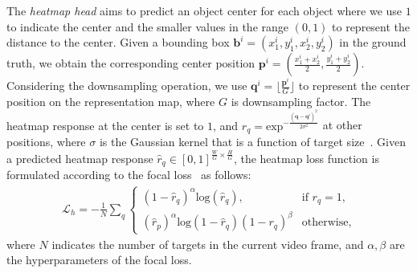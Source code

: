 \documentclass[acmsmall]{acmart}
\begin{document}
The \emph{heatmap head} {aims} to predict an object center {for each object where we use $1$ to indicate the center and the smaller values in the range $(0,1)$ to represent the distance to the center.}
Given a bounding box $\boldsymbol{b}^i = (x_1^i,y_1^i,x_2^i,y_2^i)$ in the ground truth, we obtain the corresponding center position $ \boldsymbol{p}^i  = (\frac{x_1^i+x_2^i}{2}, \frac{y_1^i+y_2^i}{2})$.
{
Considering the downsampling operation, we use $\boldsymbol{q}^i = \lfloor \frac{\boldsymbol{p}^i}{G}  \rfloor $ to represent the center position on the representation map, where $G$ is downsampling factor.
The heatmap response at the center is set to $1$, and $r_{q} =  \mathrm{exp}^{-\frac{(\boldsymbol{q} - \boldsymbol{q}^i)^2}{2\sigma ^2}}  $
} at other positions, 
where $\sigma$ is the Gaussian kernel that is a function of target size~\cite{cornernet}. 
{
Given a predicted heatmap response 
}
$\hat{r}_{q} \in [0,1]^{\frac{W}{G} \times \frac{H}{G} }$, the heatmap loss function is formulated according to the focal loss~\cite{lin2017focal} as follows:
\begin{align}
\mathcal{L}_{h} = -\frac{1}{N} \sum _{q} \begin{cases} (1-\hat{r}_{q})^\alpha \text{log}(\hat{r}_{q}), & \text{if } r_{q}=1, \\ (\hat{r}_{p})^\alpha \text{log}(1-\hat{r}_{q}) (1-r_{q})^\beta & \text{otherwise,}
\end{cases}
\end{align}
where $N$ indicates the number of targets in the current video frame, and $\alpha,\beta$ are the hyperparameters of the focal loss. 
 
\end{document}
